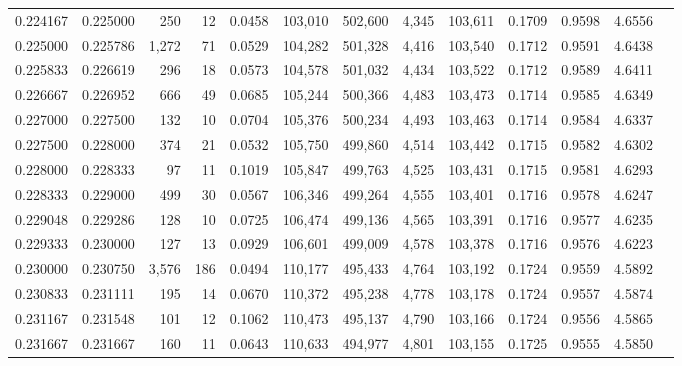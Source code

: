 \begin{tabular}{rrrrrrrrrrrrr}
0.224167 & 0.225000 &   250 &  12 &                                     0.0458 & 103,010 & 502,600 &   4,345 & 103,611 & 0.1709 & 0.9598 & 4.6556 \\
0.225000 & 0.225786 & 1,272 &  71 &                                     0.0529 & 104,282 & 501,328 &   4,416 & 103,540 & 0.1712 & 0.9591 & 4.6438 \\
0.225833 & 0.226619 &   296 &  18 &                                     0.0573 & 104,578 & 501,032 &   4,434 & 103,522 & 0.1712 & 0.9589 & 4.6411 \\
0.226667 & 0.226952 &   666 &  49 &                                     0.0685 & 105,244 & 500,366 &   4,483 & 103,473 & 0.1714 & 0.9585 & 4.6349 \\
0.227000 & 0.227500 &   132 &  10 &                                     0.0704 & 105,376 & 500,234 &   4,493 & 103,463 & 0.1714 & 0.9584 & 4.6337 \\
0.227500 & 0.228000 &   374 &  21 &                                     0.0532 & 105,750 & 499,860 &   4,514 & 103,442 & 0.1715 & 0.9582 & 4.6302 \\
0.228000 & 0.228333 &    97 &  11 &                                     0.1019 & 105,847 & 499,763 &   4,525 & 103,431 & 0.1715 & 0.9581 & 4.6293 \\
0.228333 & 0.229000 &   499 &  30 &                                     0.0567 & 106,346 & 499,264 &   4,555 & 103,401 & 0.1716 & 0.9578 & 4.6247 \\
0.229048 & 0.229286 &   128 &  10 &                                     0.0725 & 106,474 & 499,136 &   4,565 & 103,391 & 0.1716 & 0.9577 & 4.6235 \\
0.229333 & 0.230000 &   127 &  13 &                                     0.0929 & 106,601 & 499,009 &   4,578 & 103,378 & 0.1716 & 0.9576 & 4.6223 \\
0.230000 & 0.230750 & 3,576 & 186 &                                     0.0494 & 110,177 & 495,433 &   4,764 & 103,192 & 0.1724 & 0.9559 & 4.5892 \\
0.230833 & 0.231111 &   195 &  14 &                                     0.0670 & 110,372 & 495,238 &   4,778 & 103,178 & 0.1724 & 0.9557 & 4.5874 \\
0.231167 & 0.231548 &   101 &  12 &                                     0.1062 & 110,473 & 495,137 &   4,790 & 103,166 & 0.1724 & 0.9556 & 4.5865 \\
0.231667 & 0.231667 &   160 &  11 &                                     0.0643 & 110,633 & 494,977 &   4,801 & 103,155 & 0.1725 & 0.9555 & 4.5850 \\

\end{tabular}
